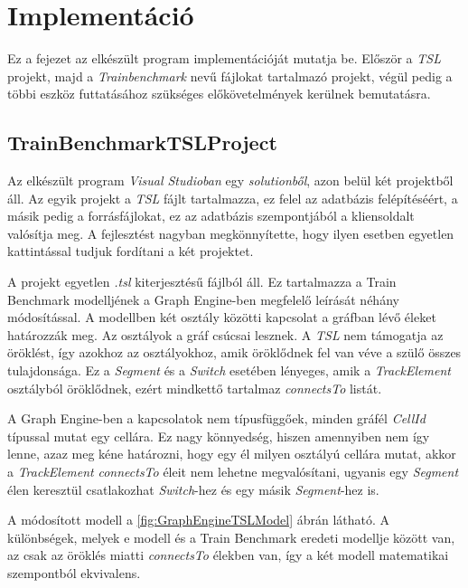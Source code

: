 \chapter{Implementáció}

Ez a fejezet az elkészült program implementációját mutatja be. Először a \emph{TSL} projekt, majd a \emph{Trainbenchmark} nevű \Csh{} fájlokat tartalmazó projekt, végül pedig a többi eszköz futtatásához szükséges előkövetelmények kerülnek bemutatásra.

\section{TrainBenchmarkTSLProject}

Az elkészült program \emph{Visual Studioban} egy \emph{solutionből}, azon belül két projektből áll. Az egyik projekt a \emph{TSL} fájlt tartalmazza, ez felel az adatbázis felépítéséért, a másik pedig a \Csh{} forrásfájlokat, ez az adatbázis szempontjából a kliensoldalt valósítja meg. A fejlesztést nagyban megkönnyítette, hogy ilyen esetben egyetlen kattintással tudjuk fordítani a két projektet.

A projekt egyetlen \emph{.tsl} kiterjesztésű fájlból áll. Ez tartalmazza a Train Benchmark modelljének a Graph Engine-ben megfelelő leírását néhány módosítással. A modellben két osztály közötti kapcsolat a gráfban lévő éleket határozzák meg. Az osztályok a gráf csúcsai lesznek. A \emph{TSL} nem támogatja az öröklést, így azokhoz az osztályokhoz, amik öröklődnek fel van véve a szülő összes tulajdonsága. Ez a \emph{Segment} és a \emph{Switch} esetében lényeges, amik a \emph{TrackElement} osztályból öröklődnek, ezért mindkettő tartalmaz \emph{connectsTo} listát.

A Graph Engine-ben a kapcsolatok nem típusfüggőek, minden gráfél \emph{CellId} típussal mutat egy cellára. Ez nagy könnyedség, hiszen amennyiben nem így lenne, azaz meg kéne határozni, hogy egy él milyen osztályú cellára mutat, akkor a \emph{TrackElement} \emph{connectsTo} éleit nem lehetne megvalósítani, ugyanis egy \emph{Segment} élen keresztül csatlakozhat \emph{Switch}-hez és egy másik \emph{Segment}-hez is.

A módosított modell a \ref{fig:GraphEngineTSLModel} ábrán látható. A különbségek, melyek e modell és a Train Benchmark eredeti modellje között van, az csak az öröklés miatti \emph{connectsTo} élekben van, így a két modell matematikai szempontból ekvivalens.

